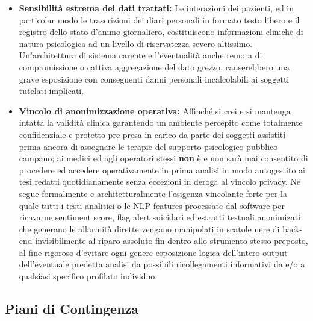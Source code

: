 \begin{itemize}
    \item \textbf{Sensibilità estrema dei dati trattati:} Le interazioni dei pazienti, ed in particolar modo le trascrizioni dei diari personali in formato testo libero e il registro dello stato d'animo giornaliero, costituiscono informazioni cliniche di natura psicologica ad un livello di riservatezza severo altissimo. Un'architettura di sistema carente e l'eventualità anche remota di compromissione o cattiva aggregazione del dato grezzo, causerebbero una grave esposizione con conseguenti danni personali incalcolabili ai soggetti tutelati implicati.
    \item \textbf{Vincolo di anonimizzazione operativa:} Affinché si crei e si mantenga intatta la validità clinica garantendo un ambiente percepito come totalmente confidenziale e protetto pre-presa in carico da parte dei soggetti assistiti prima ancora di assegnare le terapie del supporto psicologico pubblico campano; ai medici ed agli operatori stessi \textbf{non} è e non sarà mai consentito di procedere ed accedere operativamente in prima analisi in modo autogestito ai tesi redatti quotidianamente senza eccezioni in deroga al vincolo privacy. Ne segue formalmente e architetturalmente l'esigenza vincolante forte per la quale tutti i testi analitici o le NLP features processate dal software per ricavarne sentiment score, flag alert suicidari ed estratti testuali anonimizati che generano le allarmità dirette vengano manipolati in scatole nere di back-end invisibilmente al riparo assoluto fin dentro allo strumento stesso preposto, al fine rigoroso d'evitare ogni genere esposizione logica dell'intero output dell'eventuale predetta analisi da possibili ricollegamenti informativi da e/o a qualsiasi specifico profilato individuo.
\end{itemize}

\subsection*{Piani di Contingenza}

